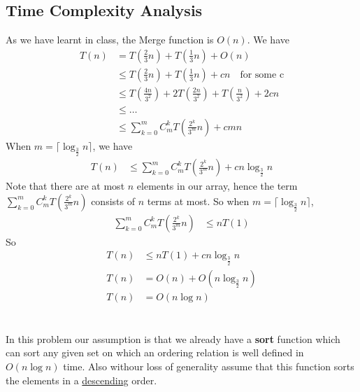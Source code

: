 \documentclass[12pt,letterpaper]{article}
\begin{document}
\subsection{Time Complexity Analysis}
As we have learnt in class, the Merge function is $O(n)$. We have
\begin{align}
    T(n)&=T(\frac{2}{3}n)+T(\frac{1}{3}n)+O(n)\\
    &\leq T(\frac{2}{3}n)+T(\frac{1}{3}n)+cn\quad \text{for some c}\\
    &\leq T(\frac{4n}{3^2})+2T(\frac{2n}{3^2})+T(\frac{n}{3^2})+2cn\\
    &\leq\dots\\
    &\leq \sum_{k=0}^m C_{m}^{k}T(\frac{2^k}{3^m}n)+cmn
\end{align}
When $m=\lceil\log_{\frac{3}{2}}n\rceil$, we have 
\begin{align}
    T(n)&\leq \sum_{k=0}^m C_{m}^{k}T(\frac{2^k}{3^m}n)+cn\log_{\frac{3}{2}}n
\end{align} 
Note that there are at most $n$ elements in our array, hence the term $\sum_{k=0}^m C_{m}^{k}T(\frac{2^k}{3^m}n)$ consists of $n$ terms at most. So when $m=\lceil\log_{\frac{3}{2}}n\rceil$,
\begin{align}
    \sum_{k=0}^m C_{m}^{k}T(\frac{2^k}{3^m}n)&\leq nT(1)
\end{align}  
So
\begin{align}
    T(n)&\leq nT(1)+cn\log_{\frac{3}{2}}n \\
    T(n)&=O(n)+O(n\log_{\frac{3}{2}}n)\\
    T(n)&=O(n\log n)
\end{align}


\section{}
In this problem our assumption is that we already have a \textbf{sort} function which can sort any given set on which an ordering relation is well defined in $O(n\log n)$ time. Also withour loss of generality assume that this function sorts the elements in a \underline{descending} order.
\end{document}
